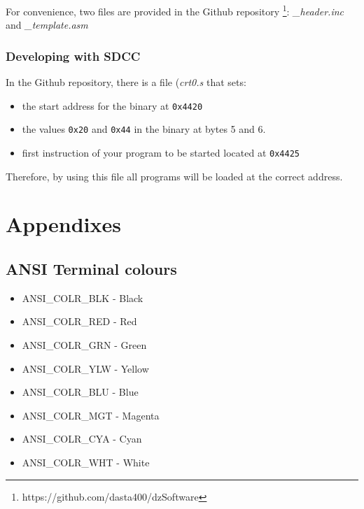 \documentclass[a4paper,11pt]{article}
\begin{document}
    For convenience, two files are provided in the Github repository
    \footnote{https://github.com/dasta400/dzSoftware}:
    \textit{\_header.inc} and \textit{\_template.asm}

    \subsubsection{Developing with SDCC}

    In the Github repository, there is a file (\textit{crt0.s} that sets:
    \begin{itemize}
        \item the start address for the binary at \texttt{0x4420}
        \item the values \texttt{0x20} and \texttt{0x44} in the binary at bytes
        5 and 6.
        \item first instruction of your program to be started located at
        \texttt{0x4425}
    \end{itemize}

    Therefore, by using this file all programs will be loaded at the correct
    address.

    \pagebreak
    \section{Appendixes}
    \label{sec:appendixes}

    \subsection{ANSI Terminal colours}

    \begin{itemize}
        \item ANSI\_COLR\_BLK - Black
        \item ANSI\_COLR\_RED - Red
        \item ANSI\_COLR\_GRN - Green
        \item ANSI\_COLR\_YLW - Yellow
        \item ANSI\_COLR\_BLU - Blue
        \item ANSI\_COLR\_MGT - Magenta
        \item ANSI\_COLR\_CYA - Cyan
        \item ANSI\_COLR\_WHT - White
    \end{itemize}
\end{document}
